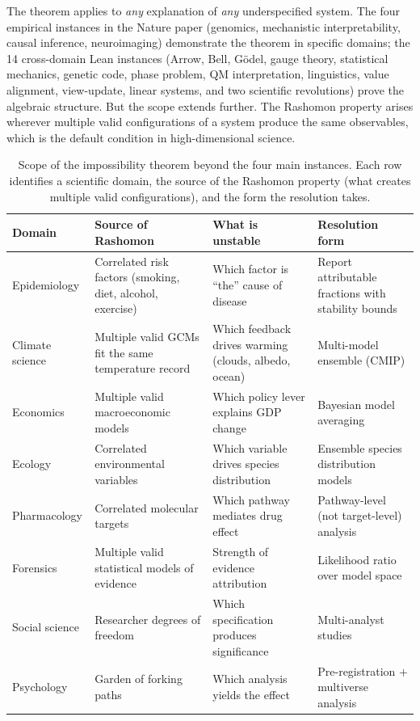 \documentclass[11pt,a4paper]{article}
\begin{document}
The theorem applies to \emph{any} explanation of \emph{any} underspecified system.  The four empirical instances in the Nature paper (genomics, mechanistic interpretability, causal inference, neuroimaging) demonstrate the theorem in specific domains; the 14 cross-domain Lean instances (Arrow, Bell, G\"odel, gauge theory, statistical mechanics, genetic code, phase problem, QM interpretation, linguistics, value alignment, view-update, linear systems, and two scientific revolutions) prove the algebraic structure.  But the scope extends further.  The Rashomon property arises wherever multiple valid configurations of a system produce the same observables, which is the default condition in high-dimensional science.

\begin{table}[h]
\centering
\small
\caption{Scope of the impossibility theorem beyond the four main instances.  Each row identifies a scientific domain, the source of the Rashomon property (what creates multiple valid configurations), and the form the resolution takes.}
\label{tab:scope}
\begin{tabular}{@{}p{2.5cm}p{4cm}p{4cm}p{3cm}@{}}
\toprule
\textbf{Domain} & \textbf{Source of Rashomon} & \textbf{What is unstable} & \textbf{Resolution form} \\
\midrule
Epidemiology & Correlated risk factors (smoking, diet, alcohol, exercise) & Which factor is ``the'' cause of disease & Report attributable fractions with stability bounds \\[4pt]
Climate science & Multiple valid GCMs fit the same temperature record & Which feedback drives warming (clouds, albedo, ocean) & Multi-model ensemble (CMIP) \\[4pt]
Economics & Multiple valid macroeconomic models & Which policy lever explains GDP change & Bayesian model averaging \\[4pt]
Ecology & Correlated environmental variables & Which variable drives species distribution & Ensemble species distribution models \\[4pt]
Pharmacology & Correlated molecular targets & Which pathway mediates drug effect & Pathway-level (not target-level) analysis \\[4pt]
Forensics & Multiple valid statistical models of evidence & Strength of evidence attribution & Likelihood ratio over model space \\[4pt]
Social science & Researcher degrees of freedom & Which specification produces significance & Multi-analyst studies \\[4pt]
Psychology & Garden of forking paths & Which analysis yields the effect & Pre-registration $+$ multiverse analysis \\
\bottomrule
\end{tabular}
\end{table}
\end{document}
